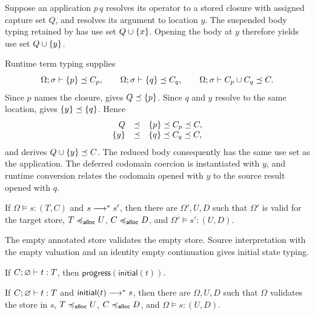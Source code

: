 \documentclass[acmsmall,screen,nonacm]{acmart}
\begin{document}
Suppose an application \(p\,q\) resolves its operator to a stored closure
with assigned capture set \(Q\), and resolves its argument to location
\(y\). The suspended body typing retained by  has use set
\(Q\cup\{{x}\}\). Opening the body at \(y\) therefore yields use set
\(Q\cup\{{y}\}\).

Runtime term typing supplies
\[
 \Omega;\sigma\vdash\{{p}\}\mathrel{\preceq} C_p,
 \qquad
 \Omega;\sigma\vdash\{{q}\}\mathrel{\preceq} C_q,
 \qquad
 \Omega;\sigma\vdash C_p\cup C_q\mathrel{\preceq} C.
\]
Since \(p\) names the closure,  gives
\(Q\mathrel{\preceq}\{{p}\}\).  Since \(q\) and \(y\) resolve to the same location,
 gives \(\{{y}\}\mathrel{\preceq}\{{q}\}\).  Hence
\[
\begin{array}{rcl}
 Q &\mathrel{\preceq}& \{{p}\}\mathrel{\preceq} C_p\mathrel{\preceq} C,
 \\
 \{{y}\} &\mathrel{\preceq}& \{{q}\}\mathrel{\preceq} C_q\mathrel{\preceq} C,
\end{array}
\]
and  derives
\(Q\cup\{{y}\}\mathrel{\preceq} C\). The reduced body consequently has the same
use set as the application. The deferred codomain coercion is
instantiated with \(y\), and runtime conversion relates the codomain opened
with \(y\) to the source result opened with \(q\).

\begin{theorem}
\label{thm:finite-preservation}
If \(\Omega\models s:(T,C)\) and \(s\longrightarrow^{*} s'\), then there are
\(\Omega',U,D\) such that \(\Omega'\) is valid for the target store,
\(T\mathrel{\preccurlyeq_{\mathsf{alloc}}} U\), \(C\mathrel{\preccurlyeq_{\mathsf{alloc}}} D\), and
\(\Omega'\models s':(U,D)\).
\end{theorem}

The empty annotated store validates the empty store.  Source interpretation
with the empty valuation and an identity empty continuation gives initial
state typing.

\begin{theorem}
\label{thm:closed-progress}
If \({C}; {\varnothing}\vdash {t} : {T}\), then
\(\mathsf{progress}(\mathsf{initial}(t))\).
\end{theorem}

\begin{theorem}
\label{thm:closed-preservation}
If \({C}; {\varnothing}\vdash {t} : {T}\) and
\(\mathsf{initial}(t)\longrightarrow^{*} s\), then there are
\(\Omega,U,D\) such that \(\Omega\) validates the store in \(s\),
\(T\mathrel{\preccurlyeq_{\mathsf{alloc}}} U\), \(C\mathrel{\preccurlyeq_{\mathsf{alloc}}} D\), and
\(\Omega\models s:(U,D)\).
\end{theorem}
\end{document}
